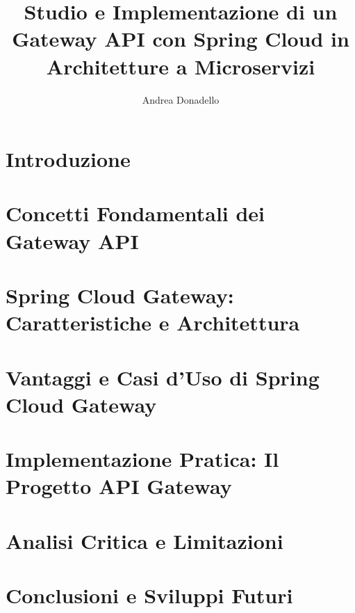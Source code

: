 \documentclass[a4paper]{book}
\title{Studio e Implementazione di un Gateway API con Spring Cloud in Architetture a Microservizi}
\author{Andrea Donadello}
\begin{document}
    \pagestyle{plain}
    \maketitle

    

    \tableofcontents

    \chapter{Introduzione}
    

    \chapter[Concetti Fondamentali]{Concetti Fondamentali dei Gateway API}
    

    \chapter[Spring Cloud Gateway]{Spring Cloud Gateway: Caratteristiche e Architettura}
    

    \chapter[Vantaggi e Casi d'Uso]{Vantaggi e Casi d'Uso di Spring Cloud Gateway}
    

    \chapter[Implementazione Pratica]{Implementazione Pratica: Il Progetto API Gateway}
    

    \chapter[Analisi e Limitazioni]{Analisi Critica e Limitazioni}
    

    \chapter{Conclusioni e Sviluppi Futuri}
    
\end{document}
